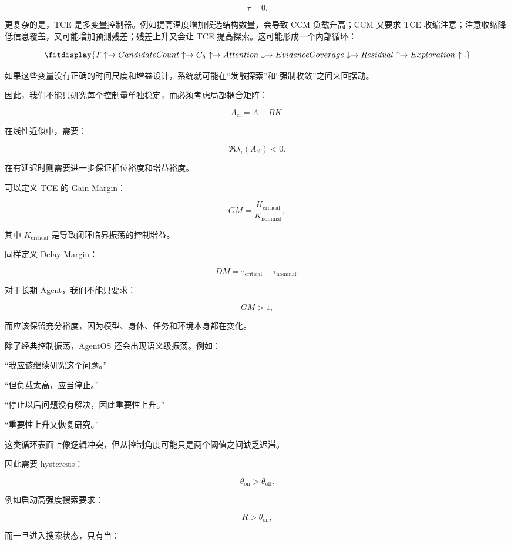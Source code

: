 \[
\tau=0.
\]

更复杂的是，TCE 是多变量控制器。例如提高温度增加候选结构数量，会导致 CCM 负载升高；CCM 又要求 TCE 收缩注意；注意收缩降低信息覆盖，又可能增加预测残差；残差上升又会让 TCE 提高探索。这可能形成一个内部循环：

\[
\fitdisplay{
T\uparrow
\rightarrow
CandidateCount\uparrow
\rightarrow
C_h\uparrow
\rightarrow
Attention\downarrow
\rightarrow
EvidenceCoverage\downarrow
\rightarrow
Residual\uparrow
\rightarrow
Exploration\uparrow.
}
\]

如果这些变量没有正确的时间尺度和增益设计，系统就可能在“发散探索”和“强制收敛”之间来回摆动。

因此，我们不能只研究每个控制量单独稳定，而必须考虑局部耦合矩阵：

\[
A_{\mathrm{cl}}
=
A-BK.
\]

在线性近似中，需要：

\[
\Re\lambda_i(A_{\mathrm{cl}})<0.
\]

在有延迟时则需要进一步保证相位裕度和增益裕度。

可以定义 TCE 的 Gain Margin：

\[
GM
=
\frac{K_{\mathrm{critical}}}{K_{\mathrm{nominal}}},
\]

其中 $K_{\mathrm{critical}}$ 是导致闭环临界振荡的控制增益。

同样定义 Delay Margin：

\[
DM
=
\tau_{\mathrm{critical}}
-
\tau_{\mathrm{nominal}}.
\]

对于长期 Agent，我们不能只要求：

\[
GM>1,
\]

而应该保留充分裕度，因为模型、身体、任务和环境本身都在变化。

除了经典控制振荡，AgentOS 还会出现语义级振荡。例如：

“我应该继续研究这个问题。”

“但负载太高，应当停止。”

“停止以后问题没有解决，因此重要性上升。”

“重要性上升又恢复研究。”

这类循环表面上像逻辑冲突，但从控制角度可能只是两个阈值之间缺乏迟滞。

因此需要 hysteresis：

\[
\theta_{\mathrm{on}}
>
\theta_{\mathrm{off}}.
\]

例如启动高强度搜索要求：

\[
R>\theta_{\mathrm{on}},
\]

而一旦进入搜索状态，只有当：

